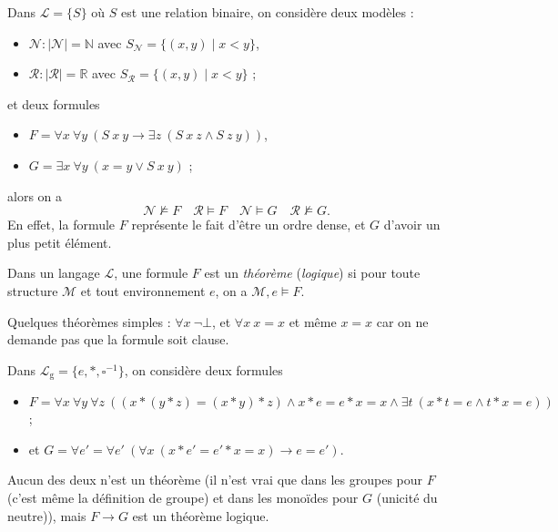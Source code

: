 \documentclass[./main]{subfiles}
\begin{document}
  \begin{exm}
    Dans $\mathcal{L} = \{S\}$ où $S$ est une relation binaire, on considère deux modèles :
    \begin{itemize}
      \item $\mathcal{N} : |\mathcal{N}| = \mathds{N}$ avec $S_{\mathcal{N}} = \{(x,y)  \mid x < y\}$,
      \item $\mathcal{R} : |\mathcal{R}| = \mathds{R}$ avec $S_{\mathcal{R}} = \{(x,y)  \mid x < y\}$ ;
    \end{itemize}
    et deux formules
    \begin{itemize}
      \item $F = \forall x \: \forall y \: (S\: x \: y \to \exists z\:(S \: x \: z \land S \: z \: y))$,
      \item $G = \exists x \: \forall y \: (x = y \lor S \: x \: y)$ ;
    \end{itemize}
    alors on a 
    \[
    \mathcal{N} \not\models F \quad \mathcal{R} \models F \quad \mathcal{N} \models G \quad \mathcal{R} \not\models G
    .\]
    En effet, la formule $F$ représente le fait d'être un ordre dense, et $G$ d'avoir un plus petit élément.
  \end{exm}

  \begin{defn}
    Dans un langage $\mathcal{L}$, une formule $F$ est un \textit{théorème} (\textit{logique}) si pour toute structure $\mathcal{M}$ et tout environnement $e$, on a $\mathcal{M}, e \models F$.
  \end{defn}

  \begin{exm}
    Quelques théorèmes simples :
    $\forall x \: \lnot \bot$, et $\forall x \: x = x$ et même $x = x$ car on ne demande pas que la formule soit clause.

    Dans $\mathcal{L}_\mathrm{g} = \{e, *, \square^{-1}\}$, on considère deux formules 
    \begin{itemize}
      \item $F = \forall x \: \forall y \: \forall z \: ((x * (y * z) = (x * y) * z) \land x * e = e * x = x \land \exists t \: (x * t = e \land t * x = e))$ ;
      \item et $G = \forall e' = \forall e'\: (\forall x\: (x * e' = e' * x = x) \to  e = e')$.
    \end{itemize}
    Aucun des deux n'est un théorème (il n'est vrai que dans les groupes pour $F$ (c'est même la définition de groupe) et dans les monoïdes pour $G$ (unicité du neutre)), mais $F \to G$ est un théorème logique.
  \end{exm}
\end{document}
